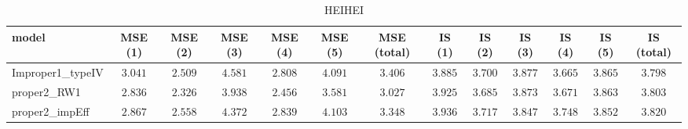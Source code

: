 \begin{table}

\caption{\label{tab:model choice Extremadura}HEIHEI}
\centering
\begin{tabular}{lcccccccccccc}
\hline
model  & MSE (1) & MSE (2) & MSE (3) & MSE (4) & MSE (5) & MSE (total) & IS (1) & IS (2) & IS (3) & IS (4) & IS (5) & \multicolumn{1}{c}{IS (total)} \\ 
\hline
Improper1_typeIV  & $3.041$ & $2.509$ & $4.581$ & $2.808$ & $4.091$ & $3.406$ & $3.885$ & $3.700$ & $3.877$ & $3.665$ & $3.865$ & $3.798$ \\
proper2_RW1  & $2.836$ & $2.326$ & $3.938$ & $2.456$ & $3.581$ & $3.027$ & $3.925$ & $3.685$ & $3.873$ & $3.671$ & $3.863$ & $3.803$ \\
proper2_impEff  & $2.867$ & $2.558$ & $4.372$ & $2.839$ & $4.103$ & $3.348$ & $3.936$ & $3.717$ & $3.847$ & $3.748$ & $3.852$ & $3.820$ \\
\hline 
\end{tabular}

\end{table}